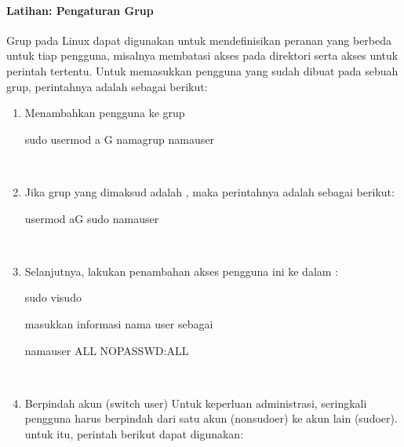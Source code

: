 \documentclass[letterpaper,10pt,english]{sphinxmanual}
\begin{document}
\paragraph{Latihan: Pengaturan Grup}
\label{\detokenize{sesi1/arsitektur:latihan-pengaturan-grup}}
Grup pada Linux dapat digunakan untuk mendefinisikan peranan yang berbeda untuk tiap pengguna, misalnya membatasi akses pada direktori serta akses untuk perintah tertentu. Untuk memasukkan pengguna yang sudah dibuat pada sebuah grup, perintahnya adalah sebagai berikut:
\begin{enumerate}
%
\item {} 
Menambahkan pengguna ke grup

\begin{sphinxVerbatim}[commandchars=\\\{\}]
sudo usermod \textendash{}a \textendash{}G namagrup namauser
\end{sphinxVerbatim}

 

\item {} 
Jika grup yang dimaksud adalah , maka perintahnya adalah sebagai berikut:

\begin{sphinxVerbatim}[commandchars=\\\{\}]
usermod \PYGZhy{}aG sudo namauser
\end{sphinxVerbatim}

 

\item {} 
Selanjutnya, lakukan penambahan akses pengguna ini ke dalam :

\begin{sphinxVerbatim}[commandchars=\\\{\}]
sudo visudo
\end{sphinxVerbatim}

masukkan informasi nama user sebagai 

\begin{sphinxVerbatim}[commandchars=\\\{\}]
namauser  ALL NOPASSWD:ALL
\end{sphinxVerbatim}

 

\item {} 
Berpindah akun (switch user)
Untuk keperluan administrasi, seringkali pengguna harus berpindah dari satu akun (non\sphinxhyphen{}sudoer) ke akun lain (sudoer). untuk itu, perintah berikut dapat digunakan:


\end{enumerate}
\end{document}
